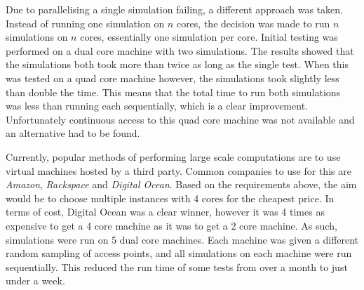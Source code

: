             Due to parallelising a single simulation failing, a different approach was taken. Instead of running one simulation on $n$ cores, the decision was made to run $n$ simulations on $n$ cores, essentially one simulation per core. Initial testing was performed on a dual core machine with two simulations. The results showed that the simulations both took more than twice as long as the single test. When this was tested on a quad core machine however, the simulations took slightly less than double the time. This means that the total time to run both simulations was less than running each sequentially, which is a clear improvement. Unfortunately continuous access to this quad core machine was not available and an alternative had to be found. 

            Currently, popular methods of performing large scale computations are to use virtual machines hosted by a third party. Common companies to use for this are \emph{Amazon}, \emph{Rackspace} and \emph{Digital Ocean}. Based on the requirements above, the aim would be to choose multiple instances with 4 cores for the cheapest price. In terms of cost, Digital Ocean was a clear winner, however it was 4 times as expensive to get a 4 core machine as it was to get a 2 core machine. As such, simulations were run on 5 dual core machines. Each machine was given a different random sampling of access points, and all simulations on each machine were run sequentially. This reduced the run time of some tests from over a month to just under a week. 


    
